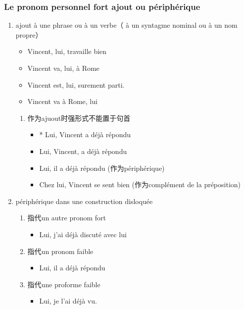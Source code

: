 \documentclass[UTF8]{report}
\begin{document}
\subsubsection{Le pronom personnel fort ajout ou périphérique}
\begin{enumerate}
    \item ajout à une phrase ou à un verbe（ à un syntagme nominal ou à un nom propre）
    \begin{itemize}
        \item Vincent, lui, travaille bien
        \item Vincent va, lui, à Rome
        \item Vincent est, lui, surement parti.
        \item Vincent va à Rome, lui
    \end{itemize}
    \begin{enumerate}
        \item 作为ajuout时强形式不能置于句首
        \begin{itemize}
            \item * Lui, Vincent a déjà répondu
            \item Lui, Vincent, a déjà répondu
            \item Lui, il a déjà répondu (作为périphérique)
            \item Chez lui, Vincent se sent bien (作为complément de la préposition)
        \end{itemize}
    \end{enumerate}
    \item périphérique dans une construction disloquée
    \begin{enumerate}
        \item 指代un autre pronom fort
        \begin{itemize}
            \item Lui, j’ai déjà discuté avec lui
        \end{itemize}
        \item 指代un pronom faible
        \begin{itemize}
            \item Lui, il a déjà répondu
        \end{itemize}
        \item 指代une proforme faible
        \begin{itemize}
            \item Lui, je l’ai déjà vu.
        \end{itemize}

\end{enumerate}
\end{enumerate}
\end{document}
